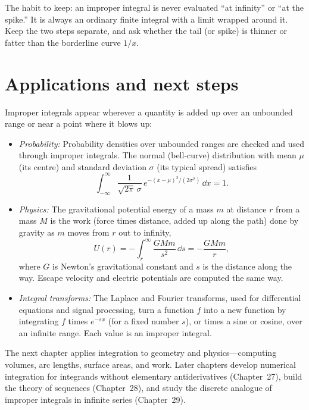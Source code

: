 The habit to keep: an improper integral is never evaluated ``at infinity'' or
``at the spike.'' It is always an ordinary finite integral with a limit wrapped
around it. Keep the two steps separate, and ask whether the tail (or spike) is
thinner or fatter than the borderline curve $1/x$.

\section{Applications and next steps}

\begin{connectionbox}
Improper integrals appear wherever a quantity is added up over an unbounded
range or near a point where it blows up:
\begin{itemize}
  \item \emph{Probability:} Probability densities over unbounded ranges are checked
  and used through improper integrals. The normal (bell-curve) distribution with
  mean $\mu$ (its centre) and standard deviation $\sigma$ (its typical spread)
  satisfies
  \[
    \int_{-\infty}^{\infty} \frac{1}{\sqrt{2\pi}\,\sigma}\, e^{-(x-\mu)^2/(2\sigma^2)}\,\dd x = 1.
  \]
  \item \emph{Physics:} The gravitational potential energy of a mass $m$ at distance
  $r$ from a mass $M$ is the work (force times distance, added up along the path)
  done by gravity as $m$ moves from $r$ out to infinity,
  \[
    U(r) = -\int_r^\infty \frac{GMm}{s^2}\,\dd s = -\frac{GMm}{r},
  \]
  where $G$ is Newton's gravitational constant and $s$ is the distance along the
  way. Escape velocity and electric potentials are computed the same way.
  \item \emph{Integral transforms:} The Laplace and Fourier transforms, used for
  differential equations and signal processing, turn a function $f$ into a new
  function by integrating $f$ times $e^{-sx}$ (for a fixed number $s$), or times a
  sine or cosine, over an infinite range. Each value is an improper integral.
\end{itemize}

The next chapter applies integration to geometry and physics---computing volumes, arc
lengths, surface areas, and work. Later chapters develop numerical integration for integrands
without elementary antiderivatives (Chapter~27), build the theory of sequences (Chapter~28),
and study the discrete analogue of improper integrals in infinite series (Chapter~29).
\end{connectionbox}

